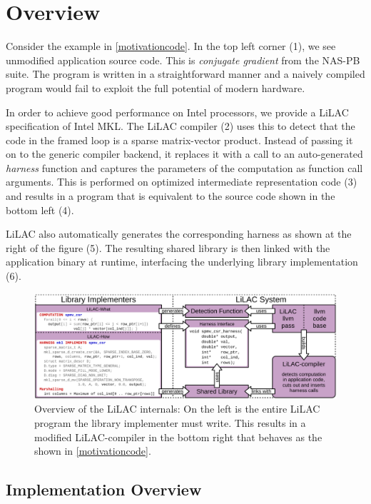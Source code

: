 \section{Overview}
\label{sec:overview}

Consider the example in \autoref{motivationcode}.  In the top left
corner (1), we see unmodified application source code.  This is
{\em conjugate gradient} from the NAS-PB suite.  The program is written
in a straightforward manner and a naively compiled program would fail
to exploit the full potential of modern hardware.

In order to achieve good performance on Intel processors, we provide a
LiLAC specification of Intel MKL.
The LiLAC compiler (2) uses this to detect that the code in the framed loop is a
sparse matrix-vector product.
Instead of passing it on to the generic compiler backend, it replaces it with a
call to an auto-generated {\em harness} function  and captures the parameters of the computation
as function call arguments.
This is performed on optimized intermediate representation code (3)
and results in a program that is equivalent to the source code shown in the
bottom left (4).

LiLAC also automatically generates the corresponding harness as shown at
the right of the figure (5).
The resulting shared library is then linked with the application binary at
runtime, interfacing the underlying library implementation (6).

\begin{figure}[t]
\includegraphics[width=\textwidth]{figures/whathowflow.pdf}
\caption{Overview of the LiLAC internals: On the left is the entire LiLAC
         program the library implementer must write. This results in a modified
         LiLAC-compiler in the bottom right that behaves as the shown in
         \autoref{motivationcode}.}
\label{motivationflow}
\end{figure}

\subsection{Implementation Overview}


